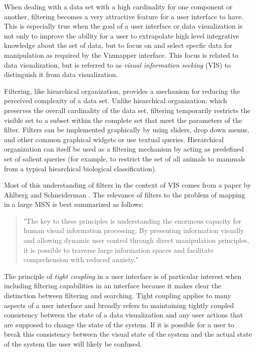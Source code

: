 When dealing with a data set with a high cardinality for one component or another, filtering becomes a very attractive feature for a user interface to have. This is especially true when the goal of a user interface or data visualization is not only to improve the ability for a user to extrapolate high level integrative knowledge about the set of data, but to focus on and select specfic data for manipulation as required by the Vizmapper interface. This focus is related to data visualization, but is referred to as \emph{visual information seeking} (VIS) to distinguish it from data visualization. 

Filtering, like hiearchical organization, provides a mechanism for reducing the perceived complexity of a data set. Unlike hiearchical organization, which preserves the overall cardinality of the data set, filtering temporarily restricts the visible set to a subset within the complete set that meet the parameters of the filter. Filters can be implemented graphically by using sliders, drop down menus, and other common graphical widgets or use textual queries. Hierarchical organization can itself be used as a filtering mechanism by acting as predefined set of salient queries (for example, to restrict the set of all animals to mammals from a typical hiearchical biological classification).

Most of this understanding of filters in the context of VIS comes from a paper by Ahlberg and Schneiderman \cite{seeking1994}. The relevance of filters to the problem of mapping in a large MSN is best summarized as follows:

\begin{quote}
"The key to these principles is understanding the enormous capacity for human visual information processing. By presenting information visually and allowing dynamic user control through direct manipulation principles, it is possible to traverse large information spaces and facilitate comprehension with reduced anxiety." \cite{seeking1994}
\end{quote}

The principle of \emph{tight coupling} in a user interface is of particular interest when including filtering capabilities in an interface because it makes clear the distinction between filtering and searching. Tight coupling applies to many aspects of a user interface and broadly refers to maintaining tightly coupled consistency between the state of a data visualization and any user actions that are supposed to change the state of the system. If it is possible for a user to break this consistency between the visual state of the system and the actual state of the system the user will likely be confused. 

